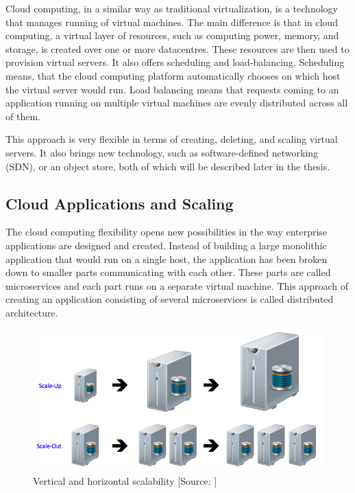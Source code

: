 Cloud computing, in a similar way as traditional virtualization, is a technology that manages running of virtual machines. The main difference is that in cloud computing, a virtual layer of resources, such as computing power, memory, and storage, is created over one or more datacentres. These resources are then used to provision virtual servers. It also offers scheduling and load-balancing. Scheduling means, that the cloud computing platform automatically chooses on which host the virtual server would run. Load balancing means that requests coming to an application running on multiple virtual machines are evenly distributed across all of them.

This approach is very flexible in terms of creating, deleting, and scaling virtual servers. It also brings new technology, such as software-defined networking (SDN), or an object store, both of which will be described later in the thesis.

\subsection{Cloud Applications and Scaling}
The cloud computing flexibility opens new possibilities in the way enterprise applications are designed and created. Instead of building a large monolithic application that would run on a single host, the application has been broken down to smaller parts communicating with each other. These parts are called microservices and each part runs on a separate virtual machine. This approach of creating an application consisting of several microservices is called distributed architecture.

\begin{figure}[!h]
  \includegraphics[width=\textwidth]{fig/kb_scale_outup.png}
  \caption{Vertical and horizontal scalability [Source: \cite{ScaleOutPicture}]}
  \label{fig:scale}
\end{figure}

